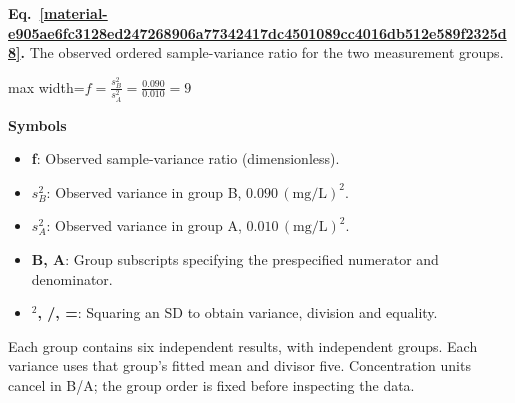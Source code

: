 \documentclass[11pt,a4paper]{article}
\begin{document}
\par\medskip
\begin{samepage}
\label{material-e905ae6fc3128ed247268906a77342417dc4501089cc4016db512e589f2325d8}
\noindent\textbf{Eq.~\ref*{material-e905ae6fc3128ed247268906a77342417dc4501089cc4016db512e589f2325d8}.} The observed ordered sample-variance ratio for the two measurement groups.\par\nopagebreak
\begin{center}\begin{adjustbox}{max width=\linewidth}$\displaystyle f=\frac{s_B^2}{s_A^2}=\frac{0.090}{0.010}=9$\end{adjustbox}\end{center}

\par\noindent\textbf{Symbols}

\begin{itemize}\setlength{\itemsep}{1pt}\setlength{\parsep}{0pt}
\item \textbf{f}: Observed sample-variance ratio (dimensionless).
\item \textbf{\(s_B^2\)}: Observed variance in group B, \(0.090\,\mathrm{(mg/L)^2}\).
\item \textbf{\(s_A^2\)}: Observed variance in group A, \(0.010\,\mathrm{(mg/L)^2}\).
\item \textbf{B, A}: Group subscripts specifying the prespecified numerator and denominator.
\item \textbf{\ensuremath{{}^2}, /, =}: Squaring an SD to obtain variance, division and equality.
\end{itemize}

Each group contains six independent results, with independent groups. Each variance uses that group's fitted mean and divisor five. Concentration units cancel in B/A; the group order is fixed before inspecting the data.

\end{samepage}
\medskip
\end{document}
